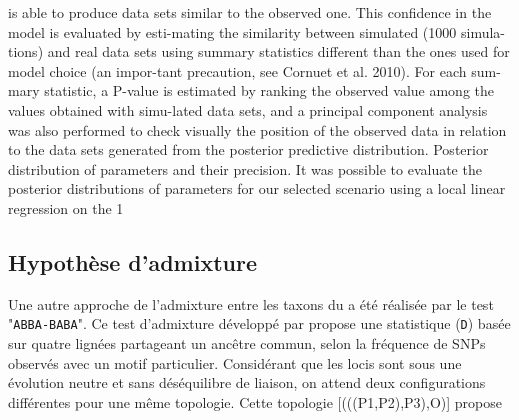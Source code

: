 is able to produce data sets similar to the observed one. This confidence in the model is evaluated by esti-mating the similarity between simulated (1000 simula-tions) and real data sets using summary statistics different than the ones used for model choice (an impor-tant precaution, see Cornuet et al. 2010). For each sum-mary statistic, a P-value is estimated by ranking the observed value among the values obtained with simu-lated data sets, and a principal component analysis was also performed to check visually the position of the observed data in relation to the data sets generated from the posterior predictive distribution. Posterior distribution of parameters and their precision. It was possible to evaluate the posterior distributions of parameters for our selected scenario using a local linear regression on the 1%

\subsection{Hypothèse d'admixture}

Une autre approche de l'admixture entre les taxons du  a été réalisée par le test "\verb|ABBA-BABA|".
 Ce test d'admixture développé par \citet{Durand2011} propose une statistique (\verb|D|) basée sur quatre lignées partageant un ancêtre commun, selon la fréquence de SNPs observés avec un motif particulier.
 Considérant que les locis sont sous une évolution neutre et sans déséquilibre de liaison, on attend deux configurations différentes pour une même topologie.
 Cette topologie [(((P1,P2),P3),O)] propose\DIFdelbegin {}\DIFdelend \DIFaddbegin {}\DIFaddend  
 
